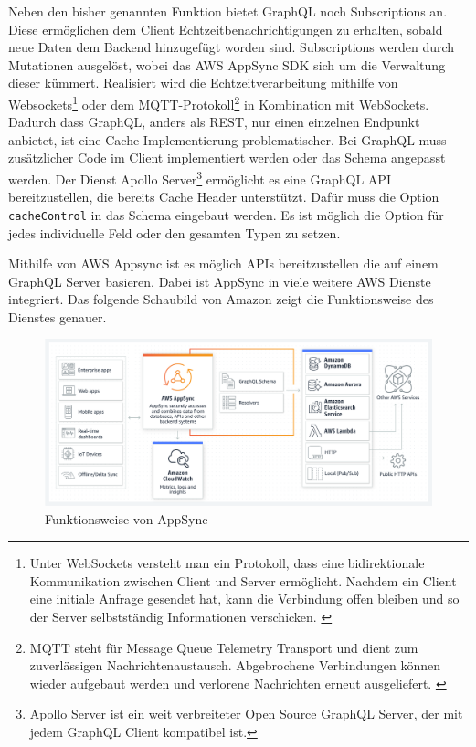 Neben den bisher genannten Funktion bietet GraphQL noch Subscriptions an.
Diese ermöglichen dem Client Echtzeitbenachrichtigungen zu erhalten, sobald neue Daten dem Backend hinzugefügt worden sind.
Subscriptions werden durch Mutationen ausgelöst, wobei das AWS AppSync SDK sich um die Verwaltung dieser kümmert.
Realisiert wird die Echtzeitverarbeitung mithilfe von Websockets\footnote{Unter WebSockets versteht man ein Protokoll, dass eine bidirektionale Kommunikation zwischen Client und Server ermöglicht. Nachdem ein Client eine initiale Anfrage gesendet hat, kann die Verbindung offen bleiben und so der Server selbstständig Informationen verschicken. \cite[]{Websockets}}
oder dem MQTT-Protokoll\footnote{MQTT steht für Message Queue Telemetry Transport und dient zum zuverlässigen Nachrichtenaustausch. Abgebrochene Verbindungen können wieder aufgebaut werden und verlorene Nachrichten erneut ausgeliefert. \cite[]{MQTT} } in Kombination mit WebSockets. \cite[]{GraphQLSubs}
Dadurch dass GraphQL, anders als REST, nur einen einzelnen Endpunkt anbietet, ist eine Cache Implementierung problematischer.
Bei GraphQL muss zusätzlicher Code im Client implementiert werden oder das Schema angepasst werden.
Der Dienst Apollo Server\footnote{Apollo Server ist ein weit verbreiteter Open Source GraphQL Server, der mit jedem GraphQL Client kompatibel ist.} ermöglicht es
eine GraphQL API bereitzustellen, die bereits Cache Header unterstützt.
Dafür muss die Option \verb+cacheControl+ in das Schema eingebaut werden.
Es ist möglich die Option für jedes individuelle Feld oder den gesamten Typen zu setzen. \cite[]{Apollo}
\cite[]{GraphQL} \cite[]{GraphQL1}


Mithilfe von AWS Appsync ist es möglich APIs bereitzustellen die auf einem GraphQL Server basieren.
Dabei ist AppSync in viele weitere AWS Dienste integriert.
Das folgende Schaubild von Amazon zeigt die Funktionsweise des Dienstes genauer.
\begin{figure}[htbp]
    \centering
    \includegraphics[width=1.0\textwidth]{40-AWS/Appsync.png}
    \caption{Funktionsweise von AppSync \cite[]{AppSync}  }
    \label{fig:meine-grafik}
\end{figure}

